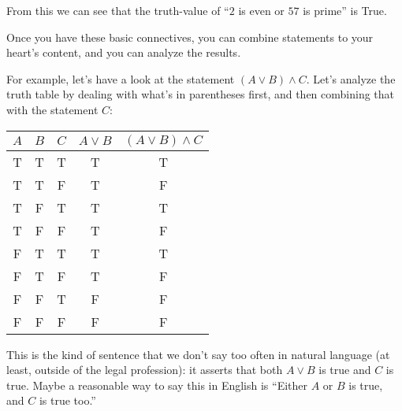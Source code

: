 \documentclass[11pt,dvipsnames]{book}
\numberwithin{figure}{section} %
\numberwithin{table}{section} %
\begin{document}
\begin{example}
From this we can see that the truth-value of ``$2$ is even or $57$ is prime'' is True.
\end{example}

\bigskip

\noindent Once you have these basic connectives, you can combine statements to your heart's content, and you can analyze the results.
\begin{example}
For example, let's have a look at the statement $(A \vee B) \wedge C$.
Let's analyze the truth table by dealing with what's in parentheses first, and then combining that with the statement $C$:
\begin{center}
    \begin{tabular}{c|c|c|c|c}
        $A$ & $B$ & $C$ & $A \vee B$ & $(A \vee B) \wedge C$ \\ \hline
        T & T & T & T & T\\
        T & T & F & T & F\\
        T & F & T & T & T\\
        T & F & F & T & F\\
        F & T & T & T & T\\
        F & T & F & T & F\\
        F & F & T & F & F\\
        F & F & F & F & F\\
    \end{tabular}
\end{center}

This is the kind of sentence that we don't say too often in natural language (at least, outside of the legal profession): it asserts that both $A \vee B$ is true and $C$ is true.
Maybe a reasonable way to say this in English is ``Either $A$ or $B$ is true, and $C$ is true too.''
\end{example}
\end{document}
